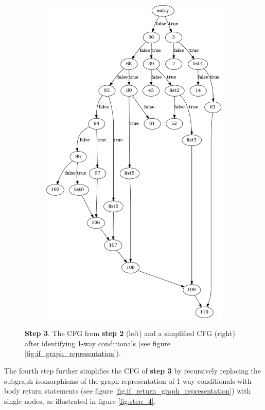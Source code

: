 \begin{figure}[htbp]
\begin{subfigure}[t]{0.45\textwidth}
		\includegraphics[width=\textwidth]{appendices/control_flow_analysis_example/stmt_3.png}
	\end{subfigure}
	\caption{\textbf{Step 3}. The CFG from \textbf{step 2} (left) and a simplified CFG (right) after identifying 1-way conditionals (see figure \ref{fig:if_graph_representation}).}
	\label{fig:step_3}
\end{figure}

The fourth step further simplifies the CFG of \textbf{step 3} by recursively replacing the subgraph isomorphisms of the graph representation of 1-way conditionals with body return statements (see figure \ref{fig:if_return_graph_representation}) with single nodes, as illustrated in figure \ref{fig:step_4}.


